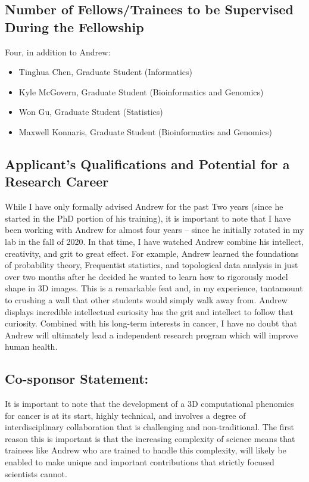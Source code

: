 \documentclass{NIHGrant}
\begin{document}
\subsection*{Number of Fellows/Trainees to be Supervised During the Fellowship}

Four, in addition to Andrew: 

\begin{itemize}
\item Tinghua Chen, Graduate Student (Informatics)
\item Kyle McGovern, Graduate Student (Bioinformatics and Genomics)
\item Won Gu, Graduate Student (Statistics)
\item Maxwell Konnaris, Graduate Student (Bioinformatics and Genomics)
\end{itemize}

\subsection*{Applicant's Qualifications and Potential for a Research Career}

While I have only formally advised Andrew for the past Two years (since he
started in the PhD portion of his training), it is important to note that I have
been working with Andrew for almost four years -- since he initially rotated in
my lab in the fall of 2020. In that time, I have watched Andrew combine his
intellect, creativity, and grit to great effect. For example, Andrew learned the
foundations of probability theory, Frequentist statistics, and topological data
analysis in just over two months after he decided he wanted to learn how to
rigorously model shape in 3D images. This is a remarkable feat and, in my
experience, tantamount to crushing a wall that other students would simply walk
away from. Andrew displays incredible intellectual curiosity has the grit and
intellect to follow that curiosity. Combined with his long-term interests in
cancer, I have no doubt that Andrew will ultimately lead a independent research
program which will improve human health.

\subsection*{Co-sponsor Statement: }
It is important to note that the development of a 3D computational phenomics for cancer is at its start, highly technical, and involves a degree of interdisciplinary collaboration that is challenging and non-traditional. The first reason this is important is that the increasing complexity of science means that trainees like Andrew who are trained to handle this complexity, will likely be enabled to make unique and important contributions that strictly focused scientists cannot. 
\end{document}
